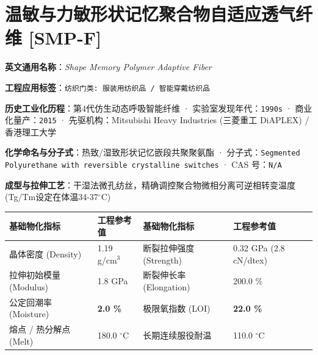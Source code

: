 \documentclass[11pt,openright,twoside,UTF8]{ctexbook}
\begin{document}
\section{温敏与力敏形状记忆聚合物自适应透气纤维 [SMP-F]}
\label{sec:smp-f}

\noindent\textbf{英文通用名称}：\textit{Shape Memory Polymer Adaptive Fiber}\par
\noindent\textbf{工程应用标签}：\texttt{纺织门类: 服装用纺织品 / 智能穿戴纺织品}\par
\noindent\textbf{历史工业化历程}：第4代仿生动态呼吸智能纤维 · 实验室发现年代：\texttt{1990s} · 商业化量产：\texttt{2015} · 先驱机构：Mitsubishi Heavy Industries (三菱重工 DiAPLEX) / 香港理工大学\par
\noindent\textbf{化学命名与分子式}：热致/湿致形状记忆嵌段共聚聚氨酯 · 分子式：\texttt{Segmented Polyurethane with reversible crystalline switches} · CAS 号：\texttt{N/A}\par
\noindent\textbf{成型与拉伸工艺}：干湿法微孔纺丝，精确调控聚合物微相分离可逆相转变温度(Tg/Tm设定在体温34-37$^\circ\mathrm{C}$)\par

\vspace{0.15cm}
\begin{center}
\small
\begin{tabularx}{\textwidth}{p{3.8cm}Xp{3.8cm}X}
\toprule
\textbf{基础物化指标} & \textbf{工程参考值} & \textbf{基础物化指标} & \textbf{工程参考值} \\
\midrule
晶体密度 (Density) & 1.19 g/cm$^3$ & 断裂拉伸强度 (Strength) & 0.32 GPa (2.8 cN/dtex) \\
拉伸初始模量 (Modulus) & 1.8 GPa & 断裂伸长率 (Elongation) & 200.0 \% \\
公定回潮率 (Moisture) & \textbf{2.0 \%} & 极限氧指数 (LOI) & \textbf{22.0 \%} \\
熔点 / 热分解点 (Melt) & 180.0 $^\circ\mathrm{C}$ & 长期连续服役耐温 & 110.0 $^\circ\mathrm{C}$ \\
\bottomrule
\end{tabularx}
\end{center}
\vspace{0.15cm}
\end{document}
